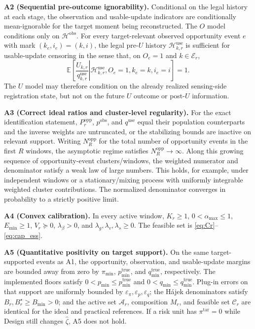 \documentclass[letterpaper,journal]{IEEEtran}
\begin{document}
\noindent\textbf{A2 (Sequential pre-outcome ignorability).}
Conditional on the legal history at each stage, the observation and
usable-update indicators are conditionally mean-ignorable for the target moment
being reconstructed.  The $O$ model conditions only on
$\mathcal{H}^{\mathrm{obs}}$.  For every target-relevant observed opportunity
event $e$ with mark $(k_e,i_e)=(k,i)$, the legal pre-$U$ history
$\mathcal{H}^{\mathrm{use}}_{k,r}$ is sufficient for usable-update censoring in
the sense that, on $O_e=1$ and $k\in\mathcal{E}_r$,
\begin{equation}
 \mathbb{E}\!\left[
 \left.
 \frac{U_{k,r}}{q^{\mathrm{use}}_{k,r}}
 \right|
 \mathcal{H}^{\mathrm{use}}_{k,r},
 O_e=1,k_e=k,i_e=i
 \right]
 =1.
 \label{eq:A2_use_mean_ignorability}
\end{equation}
The $U$ model may therefore condition on the already realized sensing-side
registration state, but not on the future $U$ outcome or post-$U$ information.

\noindent\textbf{A3 (Correct ideal ratios and cluster-level regularity).}
For the exact identification statement,
$P_r^{\mathrm{opp}}$, $p^{\mathrm{obs}}$, and $q^{\mathrm{use}}$ equal their
population counterparts and the inverse weights are untruncated, or the
stabilizing bounds are inactive on relevant support.  Writing
$N_R^{\mathrm{opp}}$ for the total number of opportunity events in the first
$R$ windows, the asymptotic regime satisfies
$N_R^{\mathrm{opp}}\rightarrow\infty$.  Along this growing sequence of
opportunity-event clusters/windows, the weighted numerator and denominator
satisfy a weak law of large numbers.  This holds, for example, under
independent windows or a stationary/mixing process with uniformly integrable
weighted cluster contributions.  The normalized denominator converges in
probability to a strictly positive limit.

\noindent\textbf{A4 (Convex calibration).}
In every active window, $K_r\ge1$, $0<\alpha_{\max}\le1$, $E_{\min}\ge1$,
$V_r\succeq0$, $\lambda_{\beta}>0$, and
$\lambda_g,\lambda_v,\lambda_s\ge0$.  The feasible set is
\eqref{eq:Cr}--\eqref{eq:cap_ess}.

\noindent\textbf{A5 (Quantitative positivity on target support).}
On the same target-supported events as A1, the opportunity, observation,
and usable-update margins are bounded away from zero by
$\pi_{\min}$, $p_{\min}^{\mathrm{true}}$, and
$q_{\min}^{\mathrm{true}}$, respectively.  The implemented floors
satisfy $0<p_{\min}\le p_{\min}^{\mathrm{true}}$ and
$0<q_{\min}\le q_{\min}^{\mathrm{true}}$.  Plug-in errors on that
support are uniformly bounded by
$\varepsilon_\pi,\varepsilon_p,\varepsilon_q$; the H\'ajek
denominators satisfy $B_r,B_r^\star\ge B_{\min}>0$; and the active set
$\mathcal{A}_r$, composition $M_r$, and feasible set
$\mathcal{C}_r$ are identical for the ideal and practical references.
If a risk unit has $\pi^{\mathrm{tar}}=0$ while Design still changes
$\widehat\zeta$, A5 does not hold.
\end{document}
